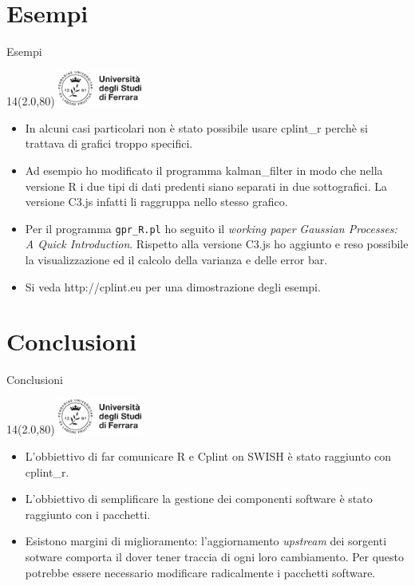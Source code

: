 \documentclass[11pt,xcolor={dvipsnames},default]{beamer} %
\newcommand{\MyLogo}{%
\begin{textblock}{14}(2.0,80)
 \includegraphics[height=1.15cm, angle=0]{logo}
\end{textblock}
}
\begin{document}
\section{Esempi}
\begin{frame}{Esempi}
\transboxin
\MyLogo
\begin{itemize}
\item In alcuni casi particolari non è stato possibile usare cplint\_r perchè 
si trattava di grafici troppo specifici.
\item Ad esempio ho modificato il programma kalman\_filter in modo che nella 
versione R i due tipi di dati predenti siano separati in due 
sottografici. La versione C3.js infatti li raggruppa nello stesso grafico.
\item Per il programma \texttt{gpr\_R.pl} ho seguito il 
\emph{working paper} \emph{Gaussian Processes: A Quick Introduction}. 
Rispetto alla versione C3.js ho aggiunto e reso possibile la 
visualizzazione ed il calcolo della varianza e delle error bar.
\item Si veda http://cplint.eu per una dimostrazione degli esempi.
\end{itemize}
\end{frame}

\section{Conclusioni}
\begin{frame}{Conclusioni}
\transboxin
\MyLogo
\begin{itemize}
\item L'obbiettivo di far comunicare R e Cplint on SWISH è stato raggiunto con
cplint\_r.
\item L'obbiettivo di semplificare la gestione dei componenti software è stato 
raggiunto con i pacchetti.
\item Esistono margini di miglioramento: l'aggiornamento \emph{upstream} dei 
sorgenti sotware comporta il dover tener traccia di ogni loro cambiamento. 
Per questo potrebbe essere necessario modificare radicalmente i pacchetti 
software.
\end{itemize}
\end{frame}
\end{document}
